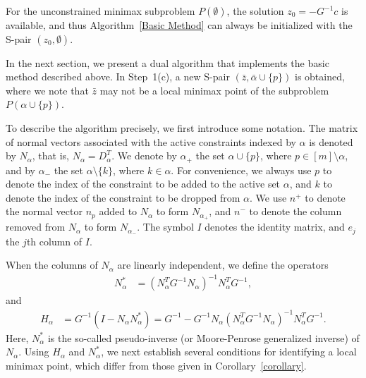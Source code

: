 \documentclass{article}
\begin{document}
	For the unconstrained minimax subproblem $P(\emptyset)$, the solution 
	$z_{0} = -G^{-1}c$ is available, and thus Algorithm~\ref{Basic Method} can always be initialized with the S-pair $(z_{0}, \emptyset)$.
	
	In the next section, we present a dual algorithm that implements the basic method described above. 
	In Step~1(c), a new S-pair $(\bar{z}, \bar{\alpha} \cup \{ p \})$ is obtained, where we note that $\bar{z}$ may not be a local minimax point of the subproblem $P(\alpha \cup \{ p \})$.
	
	To describe the algorithm precisely, we first introduce some notation. 
	The matrix of normal vectors associated with the active constraints indexed by $\alpha$ is denoted by $N_{\alpha}$, that is, $N_{\alpha} = D_{\alpha}^{T}$. 
	We denote by $\alpha_{+}$ the set $\alpha \cup \{ p \}$, where $p \in [m] \setminus \alpha$, 
	and by $\alpha_{-}$ the set $\alpha \setminus \{ k \}$, where $k \in \alpha$. 
	For convenience, we always use $p$ to denote the index of the constraint to be added to the active set $\alpha$, 
	and $k$ to denote the index of the constraint to be dropped from $\alpha$. 
	We use $n^{+}$ to denote the normal vector $n_{p}$ added to $N_{\alpha}$ to form $N_{\alpha_{+}}$, 
	and $n^{-}$ to denote the column removed from $N_{\alpha}$ to form $N_{\alpha_{-}}$. 
	The symbol $I$ denotes the identity matrix, and $e_{j}$ the $j$th column of $I$.
	
	When the columns of $N_{\alpha}$ are linearly independent, we define the operators
	\begin{align}\label{definition of Nstar}
		N_{\alpha}^{\ast} &= (N_{\alpha}^{T}G^{-1}N_{\alpha})^{-1}N_{\alpha}^{T}G^{-1},
	\end{align}
	and
	\begin{align}\label{definition of H}
		H_{\alpha} &= G^{-1}(I - N_{\alpha}N_{\alpha}^{\ast}) 
		= G^{-1} - G^{-1}N_{\alpha}(N_{\alpha}^{T}G^{-1}N_{\alpha})^{-1}N_{\alpha}^{T}G^{-1}.
	\end{align}
	Here, $N_{\alpha}^{\ast}$ is the so-called pseudo-inverse (or Moore-Penrose generalized inverse) of $N_{\alpha}$. 
	Using $H_{\alpha}$ and $N_{\alpha}^{\ast}$, we next establish several conditions for identifying a local minimax point, 
	which differ from those given in Corollary~\ref{corollary}.
	
\end{document}
